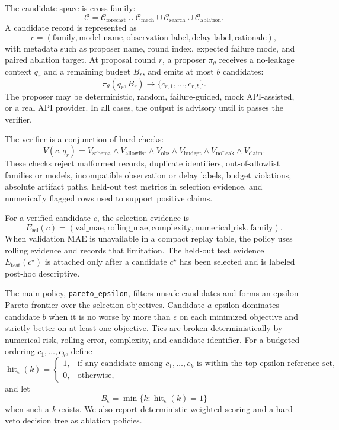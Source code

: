 The candidate space is cross-family:
\[
\mathcal{C} =
\mathcal{C}_{\mathrm{forecast}} \cup
\mathcal{C}_{\mathrm{mech}} \cup
\mathcal{C}_{\mathrm{search}} \cup
\mathcal{C}_{\mathrm{ablation}} .
\]
A candidate record is represented as
\[
c = (\mathrm{family}, \mathrm{model\_name}, \mathrm{observation\_label},
\mathrm{delay\_label}, \mathrm{rationale}),
\]
with metadata such as proposer name, round index, expected failure mode, and
paired ablation target. At proposal round $r$, a proposer $\pi_\theta$
receives a no-leakage context $q_r$ and a remaining budget $B_r$, and emits at
most $b$ candidates:
\[
\pi_\theta(q_r, B_r) \rightarrow
\{c_{r,1}, \ldots, c_{r,b}\}.
\]
The proposer may be deterministic, random, failure-guided, mock API-assisted,
or a real API provider. In all cases, the output is advisory until it passes
the verifier.

The verifier is a conjunction of hard checks:
\[
V(c, q_r) =
V_{\mathrm{schema}} \wedge
V_{\mathrm{allowlist}} \wedge
V_{\mathrm{obs}} \wedge
V_{\mathrm{budget}} \wedge
V_{\mathrm{noLeak}} \wedge
V_{\mathrm{claim}} .
\]
These checks reject malformed records, duplicate identifiers, out-of-allowlist
families or models, incompatible observation or delay labels, budget
violations, absolute artifact paths, held-out test metrics in selection
evidence, and numerically flagged rows used to support positive claims.

For a verified candidate $c$, the selection evidence is
\[
E_{\mathrm{sel}}(c) =
(\mathrm{val\_mae}, \mathrm{rolling\_mae},
\mathrm{complexity}, \mathrm{numerical\_risk}, \mathrm{family}) .
\]
When validation MAE is unavailable in a compact replay table, the policy uses
rolling evidence and records that limitation. The held-out test evidence
$E_{\mathrm{test}}(c^\star)$ is attached only after a candidate $c^\star$ has
been selected and is labeled post-hoc descriptive.

The main policy, \texttt{pareto\_epsilon}, filters unsafe candidates and forms
an epsilon Pareto frontier over the selection objectives. Candidate $a$
epsilon-dominates candidate $b$ when it is no worse by more than $\epsilon$ on
each minimized objective and strictly better on at least one objective. Ties
are broken deterministically by numerical risk, rolling error, complexity, and
candidate identifier. For a budgeted ordering $c_1,\ldots,c_k$, define
\[
\operatorname{hit}_{\epsilon}(k) =
\begin{cases}
1, & \text{if any candidate among } c_1,\ldots,c_k
\text{ is within the top-epsilon reference set},\\
0, & \text{otherwise},
\end{cases}
\]
and let
\[
B_{\epsilon} = \min\{k : \operatorname{hit}_{\epsilon}(k)=1\}
\]
when such a $k$ exists. We also report deterministic weighted scoring and a
hard-veto decision tree as ablation policies.


